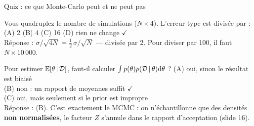\begin{frame}{Quiz : ce que Monte-Carlo peut et ne peut pas}
\footnotesize
\begin{qbox}
Vous quadruplez le nombre de simulations ($N \times 4$). L'erreur type est divisée par :
(A) 2 \qquad (B) 4 \qquad (C) 16 \qquad (D) rien ne change \quad $\checkmark$
\vspace{2mm}\\
\footnotesize Réponse : $\sigma/\sqrt{4N} = \frac12\,\sigma/\sqrt{N}$ --- divisée par 2.
Pour diviser par 100, il faut $N \times 10\,000$.
\end{qbox}
\vspace{1mm}
\begin{qbox}
Pour estimer $\mathbb{E}[\theta \,\vert\, \mathcal{D}]$, faut-il calculer
$\int p(\theta)p(\mathcal{D} \,\vert\, \theta)\mathrm{d}\theta$ ?
(A) oui, sinon le résultat est biaisé \\
(B) non : un rapport de moyennes suffit \quad $\checkmark$ \\
(C) oui, mais seulement si le prior est impropre \\
\footnotesize Réponse : (B). C'est exactement le MCMC : on n'échantillonne que des
densités \textbf{non normalisées}, le facteur $Z$ s'annule dans le rapport
d'acceptation (slide 16).
\end{qbox}
\end{frame}

